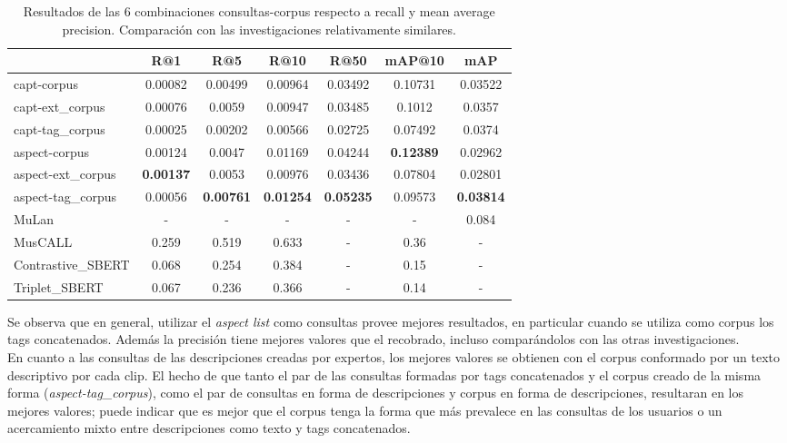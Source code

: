 \begin{table}[h]
    \footnotesize
    \centering
    \begin{tabular} { | l | c | c | c | c | c | c | }
    \hline
                      &   R@1           &   R@5   &   R@10          &   R@50          & mAP@10          &   mAP   \\ 
    \hline
    capt-corpus       & 0.00082         & 0.00499 & 0.00964         & 0.03492         & 0.10731         & 0.03522 \\
    capt-ext\_corpus   & 0.00076         & 0.0059  & 0.00947         & 0.03485         & 0.1012          & 0.0357  \\ 
    capt-tag\_corpus   & 0.00025         & 0.00202 & 0.00566         & 0.02725         & 0.07492         & 0.0374  \\ 
    aspect-corpus     & 0.00124         & 0.0047  & 0.01169         & 0.04244         &\textbf{0.12389} & 0.02962 \\ 
    aspect-ext\_corpus &\textbf{0.00137} & 0.0053  & 0.00976         & 0.03436         & 0.07804         & 0.02801 \\ 
    aspect-tag\_corpus & 0.00056 &\textbf{0.00761} &\textbf{0.01254} &\textbf{0.05235} & 0.09573 &\textbf{0.03814} \\ 
    \hline
MuLan \cite{Huang2022MuLanAJ}&    -     &    -    &         -       &        -        &        -        & 0.084   \\ 
MusCALL \cite{Manco2022ContrastiveAL}&  0.259  &  0.519  &  0.633   &        -        &  0.36           &   -     \\ 
Contrastive\_SBERT \cite{Doh2022TowardUT}& 0.068&  0.254  &  0.384   &        -        &  0.15           &   -     \\ 
Triplet\_SBERT \cite{Doh2022TowardUT} &  0.067  &  0.236  &  0.366   &        -        &  0.14           &   -     \\ 
    \hline
    \end{tabular}
    \caption{Resultados de las 6 combinaciones consultas-corpus	respecto a recall y mean average precision. Comparación con las 
    investigaciones relativamente similares.}
    \label{tab:results}
\end{table}

Se observa que en general, utilizar el \textit{aspect list} como consultas provee mejores resultados, en particular cuando se utiliza como corpus los tags concatenados. Además la precisión tiene mejores valores que el recobrado, incluso comparándolos con las otras investigaciones.\\
En cuanto a las consultas de las descripciones creadas por expertos, los mejores valores se obtienen con el corpus conformado por un texto descriptivo por cada clip. El hecho de que tanto el par de las consultas formadas por tags concatenados y el corpus creado de la misma forma (\textit{aspect-tag\_corpus}), como el par de consultas en forma de descripciones y corpus en forma de descripciones, resultaran en los mejores valores; puede indicar que es mejor que el corpus tenga la forma que más prevalece en las consultas de los usuarios o un acercamiento mixto entre descripciones como texto y tags concatenados.

